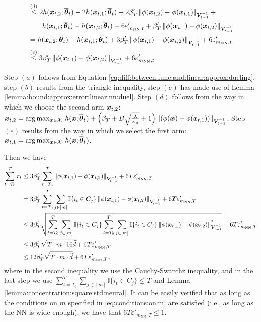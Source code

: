 \begin{equation}
\begin{split}
&\stackrel{(d)}{\leq} 2 h(\boldsymbol{x}_{t,2};\overline{\boldsymbol{\theta}}_t) - 2 h(\boldsymbol{x}_{t,1};\overline{\boldsymbol{\theta}}_t) + 2 \beta_T' \left\| \phi(\boldsymbol{x}_{t,2}) - \phi(\boldsymbol{x}_{t,1}) \right\|_{\boldsymbol{V}_{t-1}^{-1}} + \\
&\qquad h(\boldsymbol{x}_{t,1};\overline{\boldsymbol{\theta}}_t) - h(\boldsymbol{x}_{t,2};\overline{\boldsymbol{\theta}}_t) + 6\varepsilon'_{m_{\text{NN}},t} + \beta_T'\left\| \phi(\boldsymbol{x}_{t,1}) - \phi(\boldsymbol{x}_{t,2}) \right\|_{\boldsymbol{V}_{t-1}^{-1}}\\
&= h(\boldsymbol{x}_{t,2};\overline{\boldsymbol{\theta}}_t) - h(\boldsymbol{x}_{t,1};\overline{\boldsymbol{\theta}}_t) + 3 \beta_T' \left\| \phi(\boldsymbol{x}_{t,1}) - \phi(\boldsymbol{x}_{t,2}) \right\|_{\boldsymbol{V}_{t-1}^{-1}} + 6\varepsilon'_{m_{\text{NN}},t}\\
&\stackrel{(e)}{\leq} 3 \beta_T' \left\| \phi(\boldsymbol{x}_{t,1}) - \phi(\boldsymbol{x}_{t,2}) \right\|_{\boldsymbol{V}_{t-1}^{-1}} + 6\varepsilon'_{m_{\text{NN}},t}\\
\end{split}
\label{eq:upper:bound:inst:regret:neural}
\end{equation}

Step $(a)$ follows from Equation \ref{eq:diff:between:func:and:linear:approx:dueling}, step $(b)$ results from the triangle inequality, step $(c)$ has made use of Lemma \ref{lemma:bound:approx:error:linear:nn:duel}.
Step $(d)$ follows from the way in which we choose the second arm $\boldsymbol{x}_{t,2}$: $\boldsymbol{x}_{t,2} = \arg\max_{\boldsymbol{x}\in\mathcal{X}_t} h(\boldsymbol{x};\overline{\boldsymbol{\theta}}_t) + \left( \beta_T + B\sqrt{\frac{\lambda}{\kappa_\mu}} + 1 \right) \left\| \left(\phi(\boldsymbol{x}) - \phi(\boldsymbol{x}_{t,1})\right) \right\|_{\boldsymbol{V}_{t-1}^{-1}}$.
Step $(e)$ results from the way in which we select the first arm: $\boldsymbol{x}_{t,1} = \arg\max_{\boldsymbol{x}\in\mathcal{X}_t} h(\boldsymbol{x};\overline{\boldsymbol{\theta}}_t)$.
            

Then we have
\begin{align}
    \sum_{t=T_0}^T r_t &\leq 3 \beta_T' \sum_{t=T_0}^T\left\| \phi(\boldsymbol{x}_{t,1}) - \phi(\boldsymbol{x}_{t,2}) \right\|_{\boldsymbol{V}_{t-1}^{-1}} + 6T\varepsilon'_{m_{\text{NN}},T} \notag \\
    &=3 \beta_T'\sum_{t=T_0}^T\sum_{j\in[m]}\mathbb{I}\{i_t\in C_j\}\left\| \phi(\boldsymbol{x}_{t,1}) - \phi(\boldsymbol{x}_{t,2}) \right\|_{\boldsymbol{V}_{t-1}^{-1}}  + 6T\varepsilon'_{m_{\text{NN}},T}\notag\\
    &\leq 3 \beta_T'\sqrt{\sum_{t=T_0}^T\sum_{j\in[m]}\mathbb{I}\{i_t\in C_j\}\sum_{t=T_0}^T\sum_{j\in[m]}\mathbb{I}\{i_t\in C_j\}\left\| \phi(\boldsymbol{x}_{t,1}) - \phi(\boldsymbol{x}_{t,2}) \right\|_{\boldsymbol{V}_{t-1}^{-1}}^2} + 6T\varepsilon'_{m_{\text{NN}},T}\notag\\
    &\leq 3 \beta_T' \sqrt{T\cdot m\cdot 16 \widetilde{d}} + 6T\varepsilon'_{m_{\text{NN}},T}\\
    &\leq 12 \beta_T' \sqrt{T\cdot m\cdot \widetilde{d}} + 6T\varepsilon'_{m_{\text{NN}},T}\,,
\end{align}
where in the second inequality we use the Cauchy-Swarchz inequality, and in the last step we use $\sum_{t=T_0}^T\sum_{j\in[m]}\mathbb{I}\{i_t\in C_j\}\leq T$ and Lemma \ref{lemma:concentration:square:std:neural}.
It can be easily verified that as long as the conditions on $m$ specified in \cref{eq:conditions:on:m} are satisfied (i.e., as long as the NN is wide enough), we have that 
$6T\varepsilon'_{m_{\text{NN}},T} \leq 1$.

